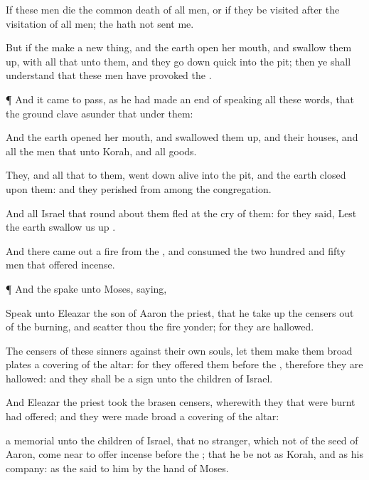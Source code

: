 {If these men
die the common
death of all
men, or if they be
visited after the
visitation of all
men;
{} the
{} hath not
sent me.

But if the
{}
make a new
thing, and the
earth
open her
mouth, and swallow them
up, with all that
{} unto them, and they go
down
quick into the
pit; then ye shall
understand that these
men have
provoked the
{}.


\par }{\PP {}¶ And it came to pass, as he had made an
end of
speaking all these
words, that the
ground clave
asunder that
{} under them:

And the
earth
opened her
mouth, and swallowed them
up, and their
houses, and all the
men that
{} unto
Korah, and all
{}
goods.

They, and all that
{} to them, went
down
alive into the
pit, and the
earth
closed upon them: and they
perished from
among the
congregation.

And all
Israel that
{} round
about them
fled at the
cry of them: for they
said, Lest the
earth swallow us
up
{}.


\par }{\PP {}And there came
out a
fire from the
{}, and
consumed the two
hundred and
fifty
men that
offered
incense.


\par }{\PP {}¶ And the
{}
spake unto
Moses,
saying,

Speak unto
Eleazar the
son of
Aaron the
priest, that he take
up the
censers
out of the
burning, and
scatter thou the
fire
yonder; for they are
hallowed.

The
censers of these
sinners against their own
souls, let them
make them
broad
plates
{} a
covering of the
altar: for they
offered them
before the
{}, therefore they are
hallowed: and they shall be a
sign unto the
children of
Israel.

And
Eleazar the
priest
took the
brasen
censers, wherewith they that were
burnt had
offered; and they were made
broad
{} a
covering of the
altar:

 a
memorial unto the
children of
Israel,
that no
stranger, which
{} not of the
seed of
Aaron, come
near to
offer
incense
before the
{}; that he be not as
Korah, and as his
company: as the
{}
said to him by the
hand of
Moses.


}
